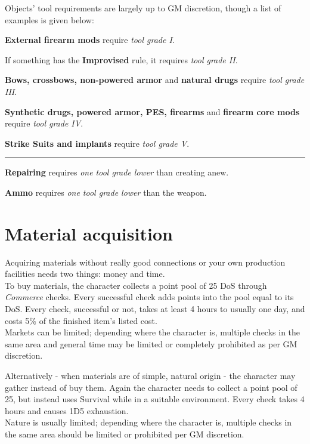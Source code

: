 \documentclass[12pt,a4paper,openany,usenames,dvipsnames]{book}
\begin{document}
	Objects’ tool requirements are largely up to GM discretion, though a list of examples is given below:
	\begin{sitemize}[8]
		\item \textbf{External firearm mods} require \emph{tool grade I}.
		\item If something has the \textbf{Improvised} rule, it requires \emph{tool grade II}.
		\item \textbf{Bows, crossbows, non-powered armor} and \textbf{natural drugs} require \emph{tool grade III}.
		\item \textbf{Synthetic drugs, powered armor, PES, firearms} and \textbf{firearm core mods} require \emph{tool grade IV}.
		\item \textbf{Strike Suits and implants} require \emph{tool grade V}.
		\hrule
		\item \textbf{Repairing} requires \emph{one tool grade lower} than creating anew.
		\item \textbf{Ammo} requires \emph{one tool grade lower} than the weapon.
	\end{sitemize}

	\chapter{Material acquisition}
	Acquiring materials without really good connections or your own production facilities needs two things: money and time.\\
	To buy materials, the character collects a point pool of 25 DoS through \emph{Commerce} checks.
	Every successful check adds points into the pool equal to its DoS.
	Every check, successful or not,
		takes at least 4 hours to usually one day,
		and costs 5\% of the finished item’s listed cost.\\
	Markets can be limited; depending where the character is, multiple checks in the same area and general time may be limited or completely prohibited as per GM discretion. \par
	Alternatively - when materials are of simple, natural origin - the character may gather instead of buy them.
	Again the character needs to collect a point pool of 25,
		but instead uses Survival while in a suitable environment.
	Every check takes 4 hours and causes 1D5 exhaustion.\\
	Nature is usually limited; depending where the character is, multiple checks in the same area should be limited or prohibited per GM discretion.
\end{document}
